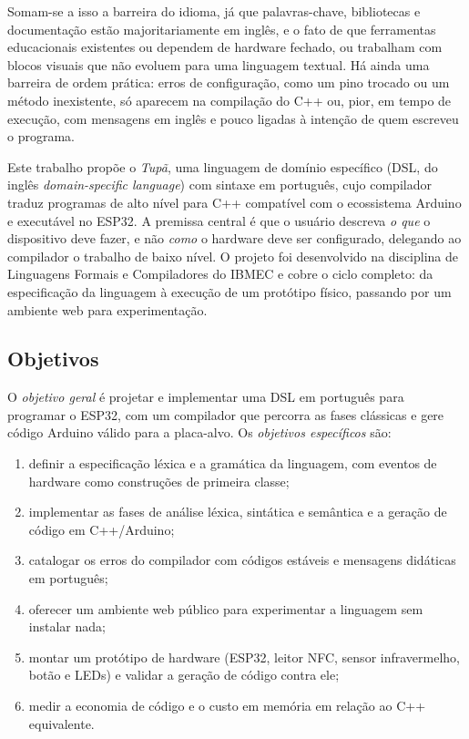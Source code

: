 \documentclass[conference]{IEEEtran}
\begin{document}
Somam-se a isso a barreira do idioma, já que palavras-chave, bibliotecas e
documentação estão majoritariamente em inglês, e o fato de que ferramentas
educacionais existentes ou dependem de hardware fechado, ou trabalham com
blocos visuais que não evoluem para uma linguagem textual. Há ainda uma
barreira de ordem prática: erros de configuração, como um pino trocado ou um
método inexistente, só aparecem na compilação do C++ ou, pior, em tempo de
execução, com mensagens em inglês e pouco ligadas à intenção de quem escreveu
o programa.

Este trabalho propõe o \textit{Tupã}, uma linguagem de domínio específico
(DSL, do inglês \textit{domain-specific language}) com sintaxe em português,
cujo compilador traduz programas de alto nível para C++ compatível com o
ecossistema Arduino e executável no ESP32. A premissa central é que o usuário
descreva \emph{o que} o dispositivo deve fazer, e não \emph{como} o hardware
deve ser configurado, delegando ao compilador o trabalho de baixo nível. O
projeto foi desenvolvido na disciplina de Linguagens Formais e Compiladores
do IBMEC e cobre o ciclo completo: da especificação da linguagem à execução
de um protótipo físico, passando por um ambiente web para experimentação.

\subsection{Objetivos}
O \emph{objetivo geral} é projetar e implementar uma DSL em português para
programar o ESP32, com um compilador que percorra as fases clássicas e gere
código Arduino válido para a placa-alvo. Os \emph{objetivos específicos} são:
\begin{enumerate}
\item definir a especificação léxica e a gramática da linguagem, com eventos
de hardware como construções de primeira classe;
\item implementar as fases de análise léxica, sintática e semântica e a
geração de código em C++/Arduino;
\item catalogar os erros do compilador com códigos estáveis e mensagens
didáticas em português;
\item oferecer um ambiente web público para experimentar a linguagem sem
instalar nada;
\item montar um protótipo de hardware (ESP32, leitor NFC, sensor
infravermelho, botão e LEDs) e validar a geração de código contra ele;
\item medir a economia de código e o custo em memória em relação ao C++
equivalente.
\end{enumerate}
\end{document}
